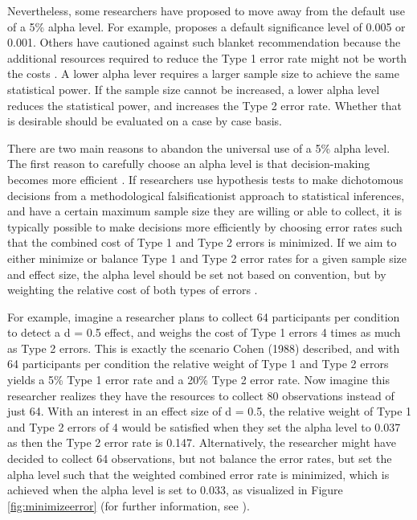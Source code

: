 \documentclass[
  oneside]{krantz}
\begin{document}
Nevertheless, some researchers have proposed to move away from the default use of a 5\% alpha level. For example, \citet{johnson_revised_2013} proposes a default significance level of 0.005 or 0.001. Others have cautioned against such blanket recommendation because the additional resources required to reduce the Type 1 error rate might not be worth the costs \citep{lakens_justify_2018}. A lower alpha lever requires a larger sample size to achieve the same statistical power. If the sample size cannot be increased, a lower alpha level reduces the statistical power, and increases the Type 2 error rate. Whether that is desirable should be evaluated on a case by case basis.

There are two main reasons to abandon the universal use of a 5\% alpha level. The first reason to carefully choose an alpha level is that decision-making becomes more efficient \citep{mudge_setting_2012}. If researchers use hypothesis tests to make dichotomous decisions from a methodological falsificationist approach to statistical inferences, and have a certain maximum sample size they are willing or able to collect, it is typically possible to make decisions more efficiently by choosing error rates such that the combined cost of Type 1 and Type 2 errors is minimized. If we aim to either minimize or balance Type 1 and Type 2 error rates for a given sample size and effect size, the alpha level should be set not based on convention, but by weighting the relative cost of both types of errors \citep{maier_justify_2022}.

For example, imagine a researcher plans to collect 64 participants per condition to detect a d = 0.5 effect, and weighs the cost of Type 1 errors 4 times as much as Type 2 errors. This is exactly the scenario Cohen (1988) described, and with 64 participants per condition the relative weight of Type 1 and Type 2 errors yields a 5\% Type 1 error rate and a 20\% Type 2 error rate. Now imagine this researcher realizes they have the resources to collect 80 observations instead of just 64. With an interest in an effect size of d = 0.5, the relative weight of Type 1 and Type 2 errors of 4 would be satisfied when they set the alpha level to 0.037 as then the Type 2 error rate is 0.147. Alternatively, the researcher might have decided to collect 64 observations, but not balance the error rates, but set the alpha level such that the weighted combined error rate is minimized, which is achieved when the alpha level is set to 0.033, as visualized in Figure \ref{fig:minimizeerror} (for further information, see \citet{maier_justify_2022}).
\end{document}
